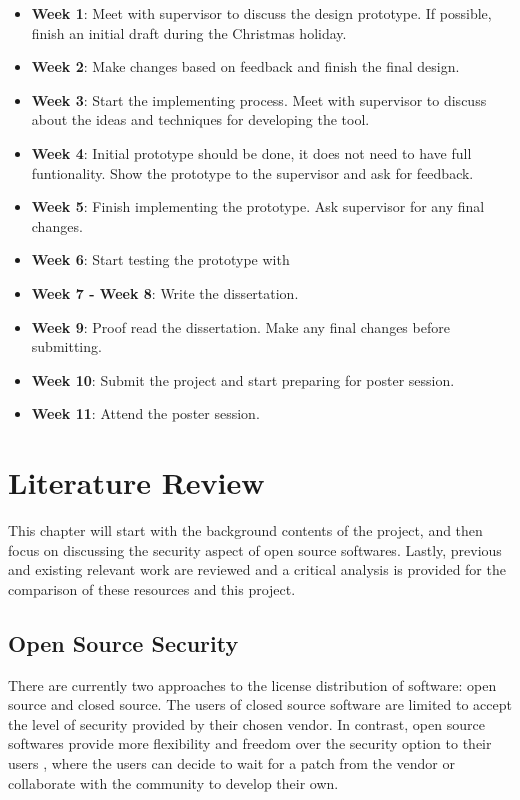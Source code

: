 \documentclass[12pt, a4paper]{report}
\begin{document}
\begin{itemize}
	\item \textbf{Week 1}: Meet with supervisor to discuss the design prototype. If possible, finish
	an initial draft during the Christmas holiday.
	\item \textbf{Week 2}: Make changes based on feedback and finish the final design.
	\item \textbf{Week 3}: Start the implementing process. Meet with supervisor to discuss about the
	ideas and techniques for developing the tool.
	\item \textbf{Week 4}: Initial prototype should be done, it does not need to have full
	funtionality. Show the prototype to the supervisor and ask for feedback.
	\item \textbf{Week 5}: Finish implementing the prototype. Ask supervisor for any final changes.
	\item \textbf{Week 6}: Start testing the prototype with
	\item \textbf{Week 7 - Week 8}: Write the dissertation.
	\item \textbf{Week 9}: Proof read the dissertation. Make any final changes before submitting.
	\item \textbf{Week 10}: Submit the project and start preparing for poster session.
	\item \textbf{Week 11}: Attend the poster session.
\end{itemize}


\chapter{Literature Review}
This chapter will start with the background contents of the project, and then focus on discussing
the security aspect of open source softwares. Lastly, previous and existing relevant work are
reviewed and a critical analysis is provided for the comparison of these resources and this project.

\section{Open Source Security}
There are currently two approaches to the license distribution of software: open source and closed
source. The users of closed source software are limited to accept the level of security
provided by their chosen vendor. In contrast, open source softwares provide more flexibility and
freedom over the security option to their users \cite{payne_2002}, where the users can decide to
wait for a patch from the vendor or collaborate with the community to develop their own.
\end{document}
